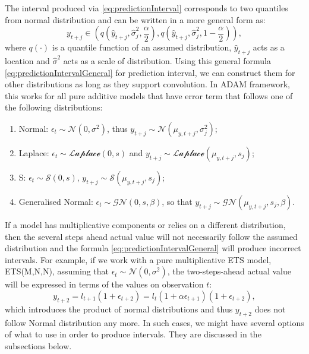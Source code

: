 \documentclass[]{book}
\providecommand{\tightlist}{%
  \setlength{\itemsep}{0pt}\setlength{\parskip}{0pt}}
\theoremstyle{definition}
\theoremstyle{definition}
\theoremstyle{definition}
\theoremstyle{definition}
\theoremstyle{remark}
\begin{document}
The interval produced via \eqref{eq:predictionInterval} corresponds to two quantiles from normal distribution and can be written in a more general form as:
\begin{equation}
    y_{t+j} \in \left(q \left(\hat{y}_{t+j},\hat{\sigma}_j^2,\frac{\alpha}{2}\right), q\left(\hat{y}_{t+j},\hat{\sigma}_j^2,1-\frac{\alpha}{2}\right)\right),
    \label{eq:predictionIntervalGeneral}
\end{equation}
where \(q(\cdot)\) is a quantile function of an assumed distribution, \(\hat{y}_{t+j}\) acts as a location and \(\hat{\sigma}^2\) acts as a scale of distribution. Using this general formula \eqref{eq:predictionIntervalGeneral} for prediction interval, we can construct them for other distributions as long as they support convolution. In ADAM framework, this works for all pure additive models that have error term that follows one of the following distributions:

\begin{enumerate}
\def\labelenumi{\arabic{enumi}.}
\tightlist
\item
  Normal: \(\epsilon_t \sim \mathcal{N}(0, \sigma^2)\), thus \(y_{t+j} \sim \mathcal{N}(\mu_{y, t+j}, \sigma_j^2)\);
\item
  Laplace: \(\epsilon_t \sim \mathcal{Laplace}(0, s)\) and \(y_{t+j} \sim \mathcal{Laplace}(\mu_{y, t+j}, s_j)\);
\item
  S: \(\epsilon_t \sim \mathcal{S}(0, s)\), \(y_{t+j} \sim \mathcal{S}(\mu_{y, t+j}, s_j)\);
\item
  Generalised Normal: \(\epsilon_t \sim \mathcal{GN}(0, s, \beta)\), so that \(y_{t+j} \sim \mathcal{GN}(\mu_{y, t+j}, s_j, \beta)\).
\end{enumerate}

If a model has multiplicative components or relies on a different distribution, then the several steps ahead actual value will not necessarily follow the assumed distribution and the formula \eqref{eq:predictionIntervalGeneral} will produce incorrect intervals. For example, if we work with a pure multiplicative ETS model, ETS(M,N,N), assuming that \(\epsilon_t \sim \mathcal{N}(0, \sigma^2)\), the two-steps-ahead actual value will be expressed in terms of the values on observation \(t\):
\begin{equation}
    y_{t+2} = l_{t+1} (1+\epsilon_{t+2}) = l_{t} (1+\alpha \epsilon_{t+1}) (1+\epsilon_{t+2}) ,
    \label{eq:ETSMNN2Steps}
\end{equation}
which introduces the product of normal distributions and thus \(y_{t+2}\) does not follow Normal distribution any more. In such cases, we might have several options of what to use in order to produce intervals. They are discussed in the subsections below.
\end{document}
